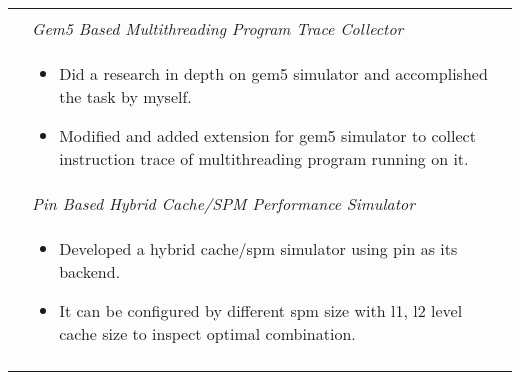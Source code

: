 \documentclass[a4paper,10pt]{article} %
\begin{document}
\begin{tabular}{r|p{11cm}}
\multicolumn{2}{c}{} \\
& \emph{Gem5 Based Multithreading Program Trace Collector}\smallskip\\
& \footnotesize{
\begin{itemize}
\item Did a research in depth on gem5 simulator and accomplished the task by myself.
\item Modified and added extension for gem5 simulator to collect instruction trace of multithreading program running on it.
\end{itemize}
}\smallskip\\
& \emph{Pin Based Hybrid Cache/SPM Performance Simulator}\\
& \footnotesize{
\begin{itemize}
\item Developed a hybrid cache/spm simulator using pin as its backend. 
\item It can be configured by different spm size with l1, l2 level cache size to inspect optimal combination. 
\end{itemize}
}\\
\multicolumn{2}{c}{} \\





\end{tabular}
\end{document}
